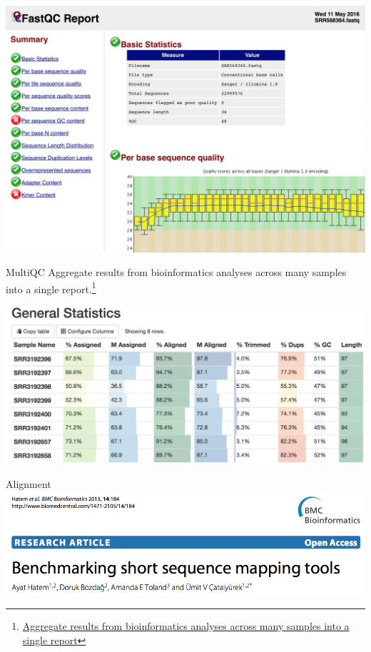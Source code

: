 \documentclass{beamer}
\begin{document}
\begin{frame}
\includegraphics[width=\linewidth]{fastqcrep.png}
\end{frame}

\begin{frame}{MultiQC}
Aggregate results from bioinformatics analyses across many samples into a single report.\footnote{\url{Aggregate results from bioinformatics analyses across many samples into a single report}}
\end{frame}

\begin{frame}
\includegraphics[width=\linewidth]{multiqc.png}
\end{frame}

\begin{frame}{Alignment}
\includegraphics[width=\linewidth]{mappaper.png}
\end{frame}
\end{document}
